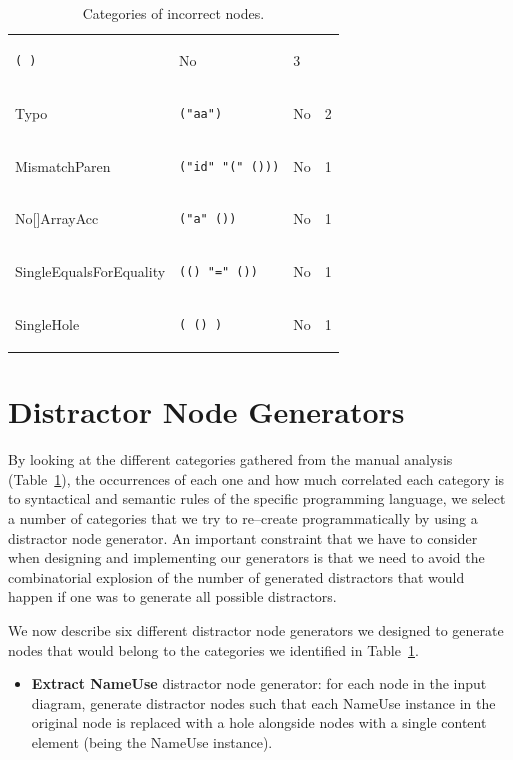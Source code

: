 \begin{chapterBody}
\begin{table}[htb!]
\begin{tabular}{lllr}
\begin{lstlisting}[language=etl]
( )
\end{lstlisting} & No & 3 \\
Typo & \begin{lstlisting}[language=etl]
("aa")
\end{lstlisting} & No & 2 \\
MismatchParen & \begin{lstlisting}[language=etl]
("id" "(" ()))
\end{lstlisting} & No & 1 \\
No[]ArrayAcc & \begin{lstlisting}[language=etl]
("a" ())
\end{lstlisting} & No & 1 \\
SingleEqualsForEquality & \begin{lstlisting}[language=etl]
(() "=" ())
\end{lstlisting} & No & 1 \\
SingleHole & \begin{lstlisting}[language=etl]
( () )
\end{lstlisting} & No & 1 \\
\end{tabular}
\caption{Categories of incorrect nodes.}
\label{tab:dn-distractors-categories}
\end{table}

\section{Distractor Node Generators}\label{sec:dn-distractors-gen}

By looking at the different categories gathered from the manual analysis
(Table~\ref{tab:dn-distractors-categories}), the occurrences of each one and
how much correlated each category is to syntactical and semantic rules of
the specific programming language, we select a number of categories that
we try to re–create programmatically by using a distractor node generator.
An important constraint that we have to consider when designing and implementing
our generators is that we need to avoid the combinatorial explosion of the number
of generated distractors that would happen if one was to generate all possible
distractors.

We now describe six different distractor node generators we designed to 
generate nodes that would belong to the categories we identified in
Table~\ref{tab:dn-distractors-categories}.

\begin{itemize}
    \item \textbf{Extract NameUse} distractor node generator: for each node in
the input diagram, generate distractor nodes such that each NameUse instance in
the original node is replaced with a hole alongside nodes with a single content
element (being the NameUse instance).


\end{itemize}
\end{chapterBody}
